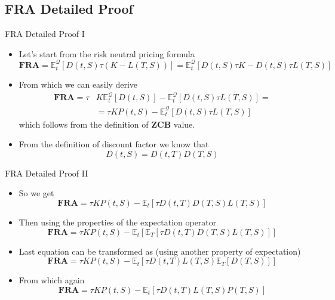 \documentclass{beamer}
\begin{document}
\subsection{FRA Detailed Proof}
\begin{frame}{FRA Detailed Proof I}
\begin{itemize}
	\item<1-> Let's start from the risk neutral pricing formula
	\begin{equation*} \textbf{FRA} = 
\mathbb{E}^\mathcal{Q}_t[D(t,S)\tau (K - L(T,S))] = 	\mathbb{E}^\mathcal{Q}_t[D(t,S)\tau K - D(t,S)\tau L(T,S)]
	\end{equation*}
	\item<2-> From which we can easily derive
	\begin{equation*}
		\begin{aligned}
		\textbf{FRA} = \tau &K\mathbb{E}_t^\mathcal{Q}[D(t,S)] - \mathbb{E}_t^\mathcal{Q}[D(t,S)\tau L(T,S)] = \\
		&=\tau KP(t,S) - \mathbb{E}_t^\mathcal{Q}[D(t,S)\tau L(T,S)]
		\end{aligned}
	\end{equation*}
	which follows from the definition of \textbf{ZCB} value.
	\item<3-> From the definition of discount factor we know that
	\begin{equation*}
		D(t,S) = D(t,T)D(T,S)
	\end{equation*}
\end{itemize}
\end{frame}

\begin{frame}{FRA Detailed Proof II}
	\begin{itemize}
		\item<1-> So we get
		\begin{equation*}
			\textbf{FRA} = \tau KP(t,S)-\mathbb{E}_t[\tau D(t,T)D(T,S)L(T,S)]
		\end{equation*}
		\item<2-> Then using the properties of the expectation operator
		\begin{equation*}
		\textbf{FRA} = \tau KP(t,S) - \mathbb{E}_t[\mathbb{E}_T[\tau D(t,T)D(T,S)L(T,S)]]
		\end{equation*}
		\item<3-> Last equation can be transformed as (using another property of expectation)
		\begin{equation*}
			\textbf{FRA} = \tau KP(t,S) - \mathbb{E}_t[\tau D(t,T)L(T,S)\mathbb{E}_T[D(T,S)]]
		\end{equation*}
		\item<4-> From which again
		\begin{equation*}
		\textbf{FRA} = \tau KP(t,S) - \mathbb{E}_t[\tau D(t,T)L(T,S)P(T,S)]
		\end{equation*}
	\end{itemize}
\end{frame}
\end{document}
